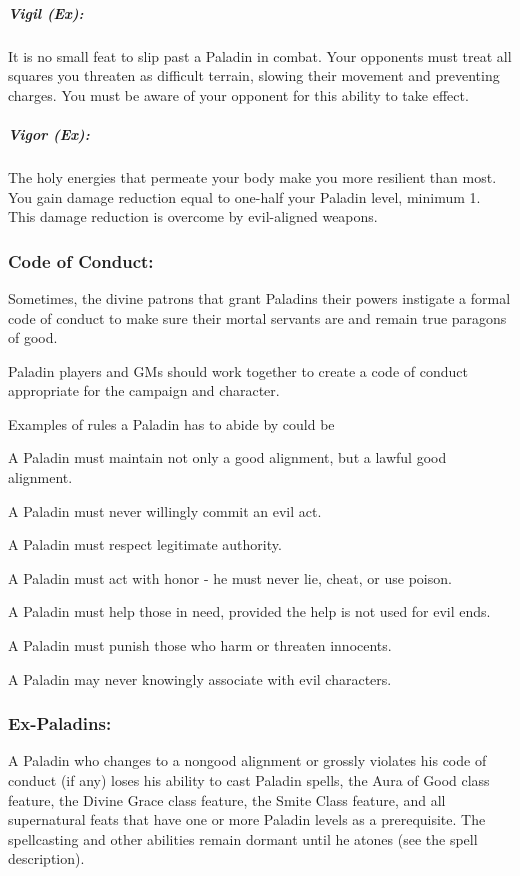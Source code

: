 \subparagraph{Vigil (Ex):}
It is no small feat to slip past a Paladin in combat. Your opponents must treat all squares you threaten as difficult terrain, slowing their movement and preventing charges. You must be aware of your opponent for this ability to take effect.

\subparagraph{Vigor (Ex):}
The holy energies that permeate your body make you more resilient than most. You gain damage reduction equal to one-half your Paladin level, minimum 1. This damage reduction is overcome by evil-aligned weapons.

\subsubsection{Code of Conduct:}
Sometimes, the divine patrons that grant Paladins their powers instigate a formal code of conduct to make sure their mortal servants are and remain true paragons of good.

Paladin players and GMs should work together to create a code of conduct appropriate for the campaign and character.

Examples of rules a Paladin has to abide by could be
\begin{list}{}{\leftmargin=1em}
 \item A Paladin must maintain not only a good alignment, but a lawful good alignment.
 \item A Paladin must never willingly commit an evil act.
 \item A Paladin must respect legitimate authority.
 \item A Paladin must act with honor - he must never lie, cheat, or use poison.
 \item A Paladin must help those in need, provided the help is not used for evil ends.
 \item A Paladin must punish those who harm or threaten innocents.
 \item A Paladin may never knowingly associate with evil characters.
\end{list}
\subsubsection{Ex-Paladins:}
A Paladin who changes to a nongood alignment or grossly violates his code of conduct (if any) loses his ability to cast Paladin spells, the Aura of Good class feature, the Divine Grace class feature, the Smite Class feature, and all supernatural feats that have one or more Paladin levels as a prerequisite.
The spellcasting and other abilities remain dormant until he atones (see the  spell description).